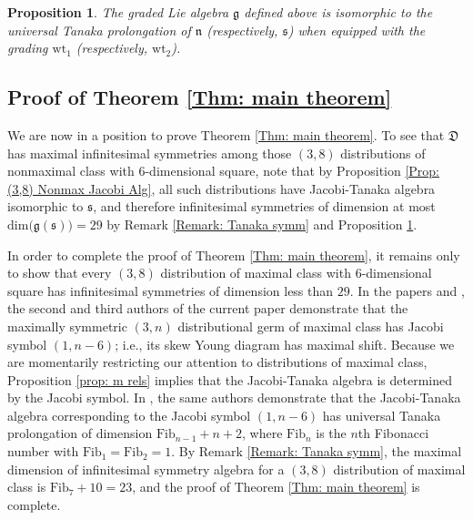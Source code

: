 \documentclass[11pt,letterpaper]{amsart}
\newtheorem{prop}[theorem]{Proposition}
\numberwithin{equation}{section}
\begin{document}
\begin{prop}
    \label{prop: Jacobi-Tanaka prolongation}
    The graded Lie algebra $\mathfrak g$ defined above is isomorphic to the universal Tanaka prolongation of $\mathfrak{n}$ (respectively, $\mathfrak s$) when equipped with the grading $\mathrm{wt}_1$ (respectively, $\mathrm{wt}_2$).
\end{prop}

\subsection{Proof of Theorem \ref{Thm: main theorem}}
\label{subsection: maximal symmetry}

We are now in a position to prove Theorem \ref{Thm: main theorem}. To see that $\mathfrak{D}$ has maximal infinitesimal symmetries among those $(3,8)$ distributions of nonmaximal class with $6$-dimensional square, note that by Proposition \ref{Prop: (3,8) Nonmax Jacobi Alg}, all such distributions have Jacobi-Tanaka algebra isomorphic to $\mathfrak s$, and therefore infinitesimal symmetries of dimension at most $\mathrm{dim}\big(\mathfrak g(\mathfrak s)\big) = 29$ by Remark \ref{Remark: Tanaka symm} and Proposition \ref{prop: Jacobi-Tanaka prolongation}.

In order to complete the proof of Theorem \ref{Thm: main theorem}, it remains only to show that every $(3,8)$ distribution of maximal class with $6$-dimensional square has infinitesimal symmetries of dimension less than $29$.
In the papers \cite{doubrov2008rank3} and \cite{doubrov2016JacobiCurves}, the second and third authors of the current paper demonstrate that the maximally symmetric $(3,n)$ distributional germ of maximal class has Jacobi symbol $(1,n-6)$; i.e., its skew Young diagram has maximal shift. Because we are momentarily restricting our attention to distributions of maximal class, Proposition \ref{prop: m rels} implies that the Jacobi-Tanaka algebra is determined by the Jacobi symbol. In \cite{doubrov2025large}, the same authors demonstrate that the Jacobi-Tanaka algebra corresponding to the Jacobi symbol $(1,n-6)$ has universal Tanaka prolongation of dimension $\mathrm{Fib}_{n-1}+n+2$, where $\mathrm{Fib}_{n}$ is the $n$th Fibonacci number with $\mathrm{Fib}_1 =\mathrm{Fib}_2 = 1$. By Remark \ref{Remark: Tanaka symm}, the maximal dimension of infinitesimal symmetry algebra for a $(3,8)$ distribution of maximal class is $\mathrm{Fib}_{7}+10 = 23$, and the proof of Theorem \ref{Thm: main theorem} is complete.
\end{document}
